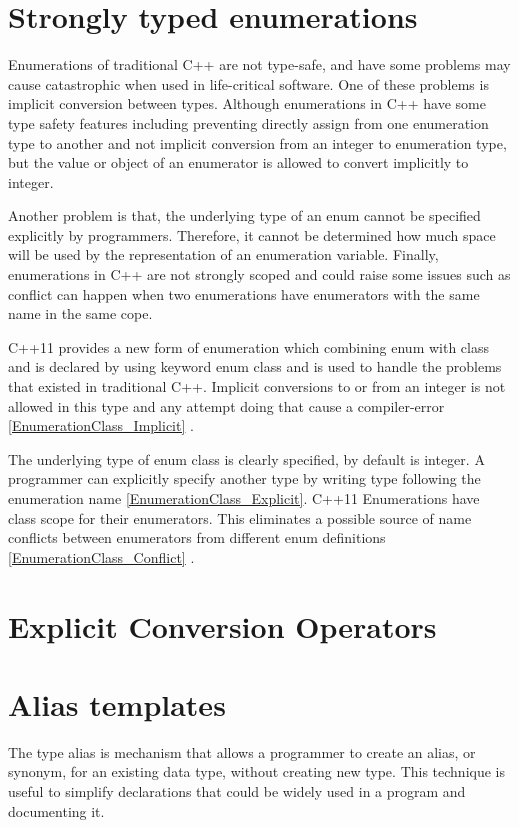 \documentclass[11pt]{report}
\begin{document}
\section{Strongly typed enumerations}
\label{section: Strongly typed enumerations}
Enumerations of traditional C++ are not type-safe, and have some problems may cause catastrophic when used in life-critical software. One of these problems is implicit conversion between types. Although enumerations in C++ have some type safety features including preventing directly assign from one enumeration type to another and not implicit conversion from an integer to enumeration type, but the value or object of an enumerator is allowed to convert implicitly to integer.


Another problem is that, the underlying type of an enum cannot be specified explicitly by programmers. Therefore, it cannot be determined how much space will be used by the representation of an enumeration variable. Finally, enumerations in C++ are not strongly scoped and could raise some issues such as conflict can happen when two enumerations have enumerators with the same name in the same cope\cite{Stroustrup:2012:Cpp11}.


C++11 provides a new form of enumeration which combining enum with class and is declared by using keyword enum class and is used to handle the problems that existed in traditional C++.  Implicit conversions to or from an integer is not allowed in this type and any attempt doing that cause a compiler-error \ref{EnumerationClass_Implicit} \cite{Overland:2011:CWF}.


The underlying type of enum class is clearly specified, by default is integer.  A programmer can explicitly specify another type by writing type following the enumeration name \ref{EnumerationClass_Explicit}. C++11 Enumerations have class scope for their enumerators. This eliminates a possible source of name conflicts between enumerators from different enum definitions \ref{EnumerationClass_Conflict} \cite{Josuttis:2012:CppStandardLibrary}.


\section{Explicit Conversion Operators}
\label{section: Explicit Conversion Operators}

\section{Alias templates}
\label{section: Alias templates}
The type alias is mechanism that allows a programmer to create an alias, or synonym, for an existing data type, without creating new type.  This technique is useful to simplify declarations that could be widely used in a program and documenting it.
\end{document}
